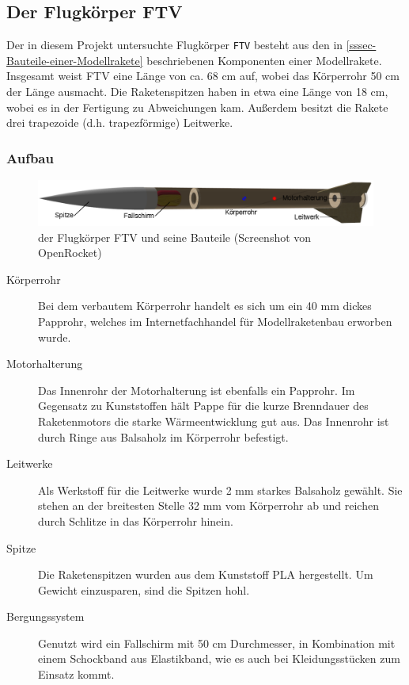 \documentclass[10pt,a4paper]{article}
\begin{document}
\subsection{Der Flugkörper FTV}

Der in diesem Projekt untersuchte Flugkörper \texttt{FTV} besteht aus den in \ref{sssec-Bauteile-einer-Modellrakete} beschriebenen Komponenten einer Modellrakete. Insgesamt weist FTV eine Länge von ca. 68 cm auf, wobei das Körperrohr 50 cm der Länge ausmacht. Die Raketenspitzen haben in etwa eine Länge von 18 cm, wobei es in der Fertigung zu Abweichungen kam. Außerdem besitzt die Rakete drei trapezoide (d.h. trapezförmige) Leitwerke.


\subsubsection{Aufbau}

\begin{figure}[ht]
	\includegraphics[width=15cm]{Bilder/Bauteile-von-FTV.png}
	\caption{der Flugkörper FTV und seine Bauteile (Screenshot von OpenRocket)}
	\centering
\end{figure}

\begin{description}
	\item[Körperrohr] Bei dem verbautem Körperrohr handelt es sich um ein 40 mm dickes Papprohr, welches im Internetfachhandel für Modellraketenbau erworben wurde.
	
	\item[Motorhalterung] Das Innenrohr der Motorhalterung ist ebenfalls ein Papprohr. Im Gegensatz zu Kunststoffen hält Pappe für die kurze Brenndauer des Raketenmotors die starke Wärmeentwicklung gut aus. Das Innenrohr ist durch Ringe aus Balsaholz im Körperrohr befestigt.
	
	\item[Leitwerke] Als Werkstoff für die Leitwerke wurde 2 mm starkes Balsaholz gewählt. Sie stehen an der breitesten Stelle 32 mm vom Körperrohr ab und reichen durch Schlitze in das Körperrohr hinein.
	
	
	\item[Spitze] Die Raketenspitzen wurden aus dem Kunststoff PLA hergestellt. Um Gewicht einzusparen, sind die Spitzen hohl.
	
	\item[Bergungssystem] Genutzt wird ein Fallschirm mit 50 cm Durchmesser, in Kombination mit einem Schockband aus Elastikband, wie es auch bei Kleidungsstücken zum Einsatz kommt.
\end{description}
\end{document}
